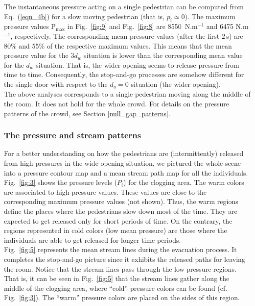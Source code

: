 The instantaneous pressure acting on a single pedestrian can be computed from 
Eq.~(\ref{eqn_4b}) for a slow moving pedestrian (that is, $p_i\simeq 0$). 
The maximum pressure values $\mathrm{P}_\mathrm{max}$ in 
Fig.~\ref{fig:9} and Fig.~\ref{fig:8} are 8550~N.m$^{-1}$ and 6475 N.m$^{-1}$, respectively. 
The corresponding mean pressure values (after the first $2\,$s) are 80\% and 
55\% of the respective maximum values. This means that the mean pressure value for the 
$3d_w$ situation is lower than the corresponding mean value for the $d_w$ situation. 
That is, the wider opening seems to release pressure from time to time. Consequently, 
the stop-and-go processes are somehow different for the 
single door with respect to the $d_g=0$ situation (the wider opening). \\

{\color{red} The above analyses corresponds to a single pedestrian moving along the middle of 
the room. It does not hold for the whole crowd. For details on the pressure patterns of the 
crowd, see Section \ref{null_gap_patterns}. } 

\subsubsection{\label{null_gap_patterns}The pressure and stream patterns}

For a better understanding on how the pedestrians are (intermittently) released 
from high pressures in the wide opening situation, we pictured the whole scene 
into a pressure contour map and a mean stream path map for all the individuals. 
Fig.~\ref{fig:3} shows the pressure levels ($P_i$) for the 
clogging area. The warm colors are associated to high pressure values. These 
values are close to the corresponding maximum pressure values (not shown). Thus, 
the warm regions define the places where the pedestrians slow down most of the 
time. They are expected to get released only for short periods of time. On the 
contrary, the regions represented in cold colors (low mean pressure) are those 
where the individuals are able to get released for longer time periods. \\

Fig.~\ref{fig:5} represents the mean stream lines during the evacuation 
process. It completes the stop-and-go picture since it exhibits the 
released paths for leaving the room. Notice that the stream lines pass 
through the low pressure regions. That is, it can be seen in Fig.~\ref{fig:5} 
that the stream lines gather along the middle of the clogging area, 
where ``cold'' pressure colors can be found (cf. Fig.~\ref{fig:3}). The 
``warm'' pressure colors are placed on the sides of this region.    \\ 

